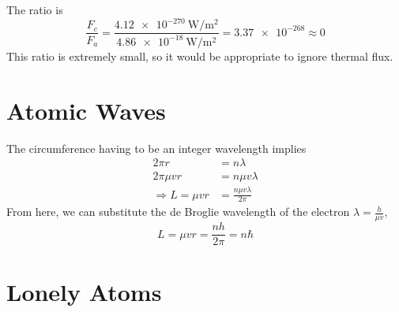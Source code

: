 \documentclass{article}
\begin{document}
\subsection{}

The ratio is
\begin{equation}
    \frac{F_c}{F_a} = \frac{\SI{4.12e-270}{\watt\per\meter\squared}}{\SI{4.86e-18}{\watt\per\meter\squared}} = \num{3.37e-268} \approx 0
\end{equation}
This ratio is extremely small, so it would be appropriate to ignore thermal flux.

\section{Atomic Waves}

The circumference having to be an integer wavelength implies
\begin{align}
    2 \pi r &= n \lambda \\
    2 \pi \mu v r &= n \mu v \lambda \\
    \Rightarrow L = \mu v r &= \frac{n \mu v \lambda}{2 \pi}
\end{align}
From here, we can substitute the de Broglie wavelength of the electron \(\lambda = \frac{h}{\mu v}\),
\begin{equation}
    L = \mu v r = \frac{n h}{2 \pi} = n \hbar
\end{equation}

\section{Lonely Atoms}

\subsection{}
\end{document}
